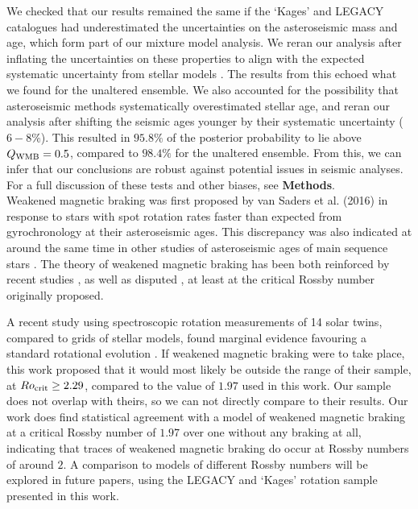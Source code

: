 \documentclass[12pt]{article}
\begin{document}
We checked that our results remained the same if the `Kages' and LEGACY catalogues had underestimated the uncertainties on the asteroseismic mass and age, which form part of our mixture model analysis. We reran our analysis after inflating the uncertainties on these properties to align with the expected systematic uncertainty from stellar models \cite{silvaaguirre+2015,silvaaguirre+2017}. The results from this echoed what we found for the unaltered ensemble. We also accounted for the possibility that asteroseismic methods systematically overestimated stellar age, and reran our analysis after shifting the seismic ages younger by their systematic uncertainty ($6-8\%$). This resulted in $95.8\%$ of the posterior probability to lie above $Q_{\rm WMB} = 0.5$, compared to $98.4\%$ for the unaltered ensemble. From this, we can infer that our conclusions are robust against potential issues in seismic analyses. For a full discussion of these tests and other biases, see \textbf{Methods}.\\

Weakened magnetic braking was first proposed by van Saders et al. (2016) \cite[hereafter the `van Saders' study]{vansaders+2016} in response to stars with spot rotation rates faster than expected from gyrochronology at their asteroseismic ages. This discrepancy was also indicated at around the same time in other studies of asteroseismic ages of main sequence stars \cite{angus+2015, nielsen+2015,  davies+2015}. The theory of weakened magnetic braking has been both reinforced by recent studies \cite{metcalfe+egeland2019}, as well as disputed \cite{lorenzo-oliveira+2019}, at least at the critical Rossby number originally proposed.

A recent study using spectroscopic rotation measurements of 14 solar twins, compared to grids of stellar models, found marginal evidence favouring a standard rotational evolution \cite{lorenzo-oliveira+2019}. If weakened magnetic braking were to take place, this work proposed that it would most likely be outside the range of their sample, at $Ro_{\rm {crit}} \geq 2.29$, compared to the value of $1.97$ used in this work. Our sample does not overlap with theirs, so we can not directly compare to their results. Our work does find statistical agreement with a model of weakened magnetic braking at a critical Rossby number of $1.97$ over one without any braking at all, indicating that traces of weakened magnetic braking do occur at Rossby numbers of around $2$. A comparison to models of different Rossby numbers will be explored in future papers, using the LEGACY and `Kages' rotation sample presented in this work.
\end{document}
